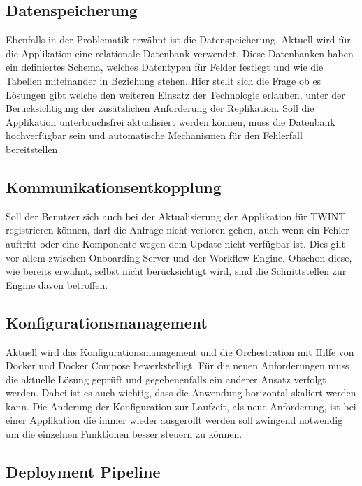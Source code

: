 \subsection{Datenspeicherung}

Ebenfalls in der Problematik erwähnt ist die Datenspeicherung. Aktuell wird für die Applikation eine relationale Datenbank verwendet. Diese Datenbanken haben ein definiertes Schema, welches Datentypen für Felder festlegt und wie die Tabellen miteinander in Beziehung stehen. Hier stellt sich die Frage ob es Lösungen gibt welche den weiteren Einsatz der Technologie erlauben, unter der Berücksichtigung der zusätzlichen Anforderung der Replikation. Soll die Applikation unterbruchsfrei aktualisiert werden können, muss die Datenbank hochverfügbar sein und automatische Mechanismen für den Fehlerfall bereitstellen.

\subsection{Kommunikationsentkopplung}

Soll der Benutzer sich auch bei der Aktualisierung der Applikation für TWINT registrieren können, darf die Anfrage nicht verloren gehen, auch wenn ein Fehler auftritt oder eine Komponente wegen dem Update nicht verfügbar ist. Dies gilt vor allem zwischen Onboarding Server und der Workflow Engine. Obschon diese, wie bereits erwähnt, selbst nicht berücksichtigt wird, sind die Schnittstellen zur Engine davon betroffen.

\subsection{Konfigurationsmanagement}

Aktuell wird das Konfigurationsmanagement und die Orchestration mit Hilfe von Docker und Docker Compose bewerkstelligt. Für die neuen Anforderungen muss die aktuelle Lösung geprüft und gegebenenfalls ein anderer Ansatz verfolgt werden. Dabei ist es auch wichtig, dass die Anwendung horizontal skaliert werden kann. Die Änderung der Konfiguration zur Laufzeit, als neue Anforderung, ist bei einer Applikation die immer wieder ausgerollt werden soll zwingend notwendig um die einzelnen Funktionen besser steuern zu können.

\subsection{Deployment Pipeline}

